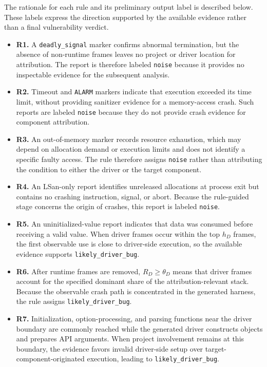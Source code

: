 \documentclass[pdflatex,sn-basic]{sn-jnl}%
\theoremstyle{thmstyleone}%
\theoremstyle{thmstyletwo}%
\theoremstyle{thmstylethree}%
\begin{document}
The rationale for each rule and its preliminary output label is described below.
These labels express the direction supported by the available evidence rather than a final vulnerability verdict.

\begin{itemize}
    \item \textbf{R1.} A \texttt{deadly\_signal} marker confirms abnormal termination, but the absence of non-runtime frames leaves no project or driver location for attribution. The report is therefore labeled \texttt{noise} because it provides no inspectable evidence for the subsequent analysis.
    \item \textbf{R2.} Timeout and \texttt{ALARM} markers indicate that execution exceeded its time limit, without providing sanitizer evidence for a memory-access crash. Such reports are labeled \texttt{noise} because they do not provide crash evidence for component attribution.
    \item \textbf{R3.} An out-of-memory marker records resource exhaustion, which may depend on allocation demand or execution limits and does not identify a specific faulty access. The rule therefore assigns \texttt{noise} rather than attributing the condition to either the driver or the target component.
    \item \textbf{R4.} An LSan-only report identifies unreleased allocations at process exit but contains no crashing instruction, signal, or abort. Because the rule-guided stage concerns the origin of crashes, this report is labeled \texttt{noise}.
    \item \textbf{R5.} An uninitialized-value report indicates that data was consumed before receiving a valid value. When driver frames occur within the top \(h_D\) frames, the first observable use is close to driver-side execution, so the available evidence supports \texttt{likely\_driver\_bug}.
    \item \textbf{R6.} After runtime frames are removed, \(R_D\ge \theta_D\) means that driver frames account for the specified dominant share of the attribution-relevant stack. Because the observable crash path is concentrated in the generated harness, the rule assigns \texttt{likely\_driver\_bug}.
    \item \textbf{R7.} Initialization, option-processing, and parsing functions near the driver boundary are commonly reached while the generated driver constructs objects and prepares API arguments. When project involvement remains at this boundary, the evidence favors invalid driver-side setup over target-component-originated execution, leading to \texttt{likely\_driver\_bug}.

\end{itemize}
\end{document}
